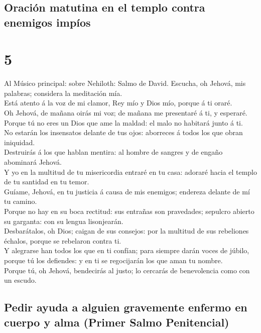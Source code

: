 \hypertarget{oraciuxf3n-matutina-en-el-templo-contra-enemigos-impuxedos}{%
\subsection{Oración matutina en el templo contra enemigos
impíos}\label{oraciuxf3n-matutina-en-el-templo-contra-enemigos-impuxedos}}

\hypertarget{section-19-5}{%
\section{5}\label{section-19-5}}

 Al Músico principal: sobre Nehiloth: Salmo de David.
Escucha, oh Jehová, mis palabras; considera la meditación mía.\\
 Está atento á la voz de mi clamor, Rey mío y Dios mío,
porque á ti oraré.\\
 Oh Jehová, de mañana oirás mi voz; de mañana me
presentaré á ti, y esperaré.\\
 Porque tú no eres un Dios que ame la maldad: el malo no
habitará junto á ti.\\
 No estarán los insensatos delante de tus ojos: aborreces
á todos los que obran iniquidad.\\
 Destruirás á los que hablan mentira: al hombre de sangres
y de engaño abominará Jehová.\\
 Y yo en la multitud de tu misericordia entraré en tu
casa: adoraré hacia el templo de tu santidad en tu temor.\\
 Guíame, Jehová, en tu justicia á causa de mis enemigos;
endereza delante de mí tu camino.\\
 Porque no hay en su boca rectitud: sus entrañas son
pravedades; sepulcro abierto su garganta: con su lengua lisonjearán.\\
 Desbarátalos, oh Dios; caigan de sus consejos: por la
multitud de sus rebeliones échalos, porque se rebelaron contra ti.\\
 Y alegrarse han todos los que en ti confían; para
siempre darán voces de júbilo, porque tú los defiendes: y en ti se
regocijarán los que aman tu nombre.\\
 Porque tú, oh Jehová, bendecirás al justo; lo cercarás
de benevolencia como con un escudo.

\hypertarget{pedir-ayuda-a-alguien-gravemente-enfermo-en-cuerpo-y-alma-primer-salmo-penitencial}{%
\subsection{Pedir ayuda a alguien gravemente enfermo en cuerpo y alma
(Primer Salmo
Penitencial)}\label{pedir-ayuda-a-alguien-gravemente-enfermo-en-cuerpo-y-alma-primer-salmo-penitencial}}

